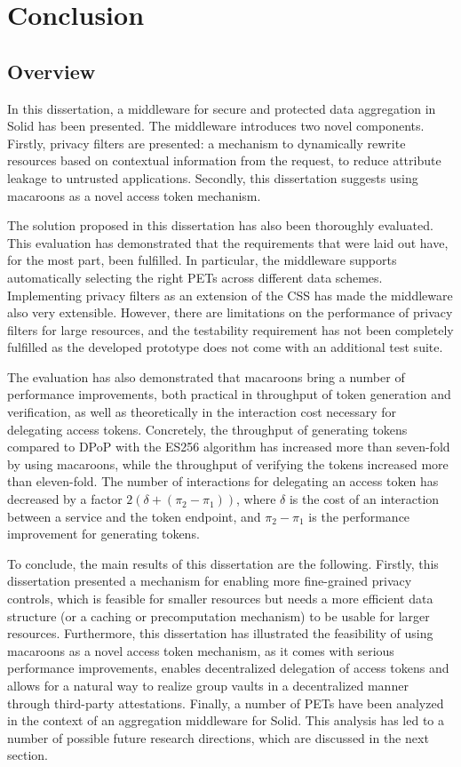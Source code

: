 \chapter{Conclusion}
\label{cha:conclusion}
\section{Overview}
In this dissertation, a middleware for secure and protected data aggregation in Solid has been presented. The middleware introduces two novel components. Firstly, privacy filters are presented: a mechanism to dynamically rewrite resources based on contextual information from the request, to reduce attribute leakage to untrusted applications. Secondly, this dissertation suggests using macaroons as a novel access token mechanism. 

The solution proposed in this dissertation has also been thoroughly evaluated. This evaluation has demonstrated that the requirements that were laid out have, for the most part, been fulfilled. In particular, the middleware supports automatically selecting the right PETs across different data schemes. Implementing privacy filters as an extension of the \gls{CSS} has made the middleware also very extensible. However, there are limitations on the performance of privacy filters for large resources, and the testability requirement has not been completely fulfilled as the developed prototype does not come with an additional test suite. 

The evaluation has also demonstrated that macaroons bring a number of performance improvements, both practical in throughput of token generation and verification, as well as theoretically in the interaction cost necessary for delegating access tokens. Concretely, the throughput of generating tokens compared to \gls{DPoP} with the ES256 algorithm has increased more than seven-fold by using macaroons, while the throughput of verifying the tokens increased more than eleven-fold. The number of interactions for delegating an access token has decreased by a factor $2(\delta + (\pi_2 - \pi_1))$, where $\delta$ is the cost of an interaction between a service and the token endpoint, and $\pi_2 - \pi_1$ is the performance improvement for generating tokens.

To conclude, the main results of this dissertation are the following. Firstly, this dissertation presented a mechanism for enabling more fine-grained privacy controls, which is feasible for smaller resources but needs a more efficient data structure (or a caching or precomputation mechanism) to be usable for larger resources. Furthermore, this dissertation has illustrated the feasibility of using macaroons as a novel access token mechanism, as it comes with serious performance improvements, enables decentralized delegation of access tokens and allows for a natural way to realize group vaults in a decentralized manner through third-party attestations. Finally, a number of \acrlong{PETs} have been analyzed in the context of an aggregation middleware for Solid. This analysis has led to a number of possible future research directions, which are discussed in the next section.

